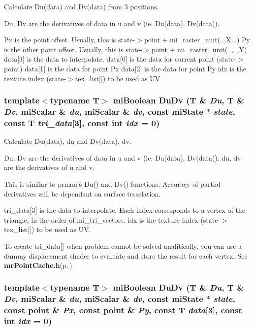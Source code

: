 Calculate Du(data) and Dv(data) from 3 positions.

Du, Dv are the derivatives of data in u and v (ie. Du(data), Dv(data)).

Px is the point offset. Usually, this is state-$>$point + mi\_\-raster\_\-unit(..,X,..) Py is the other point offset. Usually, this is state-$>$point + mi\_\-raster\_\-unit(..,..,Y) data[3] is the data to interpolate. data[0] is the data for current point (state-$>$point) data[1] is the data for point Px data[2] is the data for point Py idx is the texture index (state-$>$tex\_\-list[]) to be used as UV. 
\subsubsection{\setlength{\rightskip}{0pt plus 5cm}template$<$typename T$>$ mi\-Boolean Du\-Dv (T \& {\em Du}, T \& {\em Dv}, mi\-Scalar \& {\em du}, mi\-Scalar \& {\em dv}, const mi\-State $\ast$ {\em state}, const T {\em tri\_\-data}[3], const int {\em idx} = 0)\hspace{0.3cm}{\tt  [inline]}}\label{namespacemr_a43}


Calculate Du(data), du and Dv(data), dv.

Du, Dv are the derivatives of data in u and v (ie. Du(data), Dv(data)). du, dv are the derivatives of u and v.

This is similar to prman's Du() and Dv() functions. Accuracy of partial derivatives will be dependant on surface tesselation.

tri\_\-data[3] is the data to interpolate. Each index corresponds to a vertex of the triangle, in the order of mi\_\-tri\_\-vectors. idx is the texture index (state-$>$tex\_\-list[]) to be used as UV.

To create tri\_\-data[] when problem cannot be solved analitically, you can use a dummy displacement shader to evaluate and store the result for each vertex. See {\bf mr\-Point\-Cache.h}{\rm (p.\,\pageref{mrPointCache_8h})} 
\subsubsection{\setlength{\rightskip}{0pt plus 5cm}template$<$typename T$>$ mi\-Boolean Du\-Dv (T \& {\em Du}, T \& {\em Dv}, mi\-Scalar \& {\em du}, mi\-Scalar \& {\em dv}, const mi\-State $\ast$ {\em state}, const point \& {\em Px}, const point \& {\em Py}, const T {\em data}[3], const int {\em idx} = 0)\hspace{0.3cm}{\tt  [inline]}}\label{namespacemr_a42}


